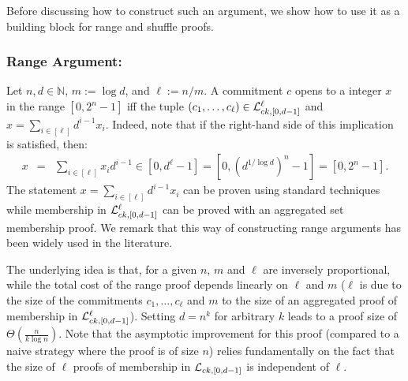 Before discussing how to construct such an argument, we show how to use it as a building block for range and shuffle proofs.  
\subsubsection{Range Argument:}
Let $n,d\in\mathbb{N}$, $m:=\log d$, and $\ell:=n/m$. A commitment $c$ opens to a integer $x$ in the range $[0,2^n-1]$ iff the tuple $(c_1,\ldots,c_\ell) \in\mathcal{L}_{ck,[0,d-1]}^\ell$ and  $x=\sum_{i\in[\ell]}d^{i-1}x_i$. Indeed, note that if the right-hand side of this implication is satisfied, then: 
\begin{eqnarray*}
x & = & \sum_{i\in[\ell]} x_i d^{i-1}
   \in  [0,d^\ell-1]  =  [0,(d^{1/\log d})^n-1] = [0,2^n-1].
\end{eqnarray*}
The statement  $x=\sum_{i\in[\ell]}d^{i-1}x_i$ can be proven using standard techniques while membership in $\mathcal{L}_{ck,[0,d-1]}^\ell$ can be proved with an aggregated set membership proof. 
We remark that this way of constructing range arguments has been widely used in the literature.

The underlying idea is that, for a given $n$, $m$ and $\ell$ are inversely proportional, while the total cost of the range proof depends linearly on $\ell$ and $m$ ($\ell$ is due to the size of the commitments $c_1,\ldots,c_\ell$ and $m$ to the size of an aggregated proof of membership in $\mathcal{L}_{ck,[0,d-1]}^\ell$).  Setting $d=n^{k}$ for arbitrary $k$ leads to a proof size of $\Theta(\frac{n}{k \log n})$. 
Note that the asymptotic improvement for this proof (compared to a naive strategy where the proof is of size $n$) relies fundamentally on the fact that the size of $\ell$ proofs of membership in $\mathcal{L}_{ck,[0,d-1]}$ is independent of $\ell$. 
